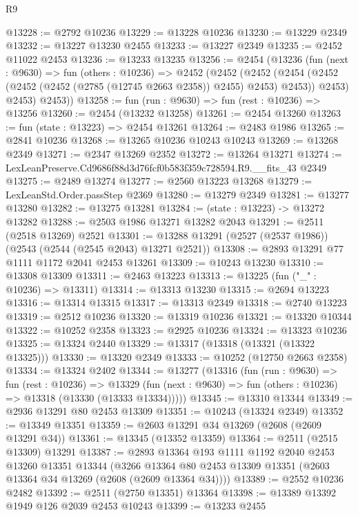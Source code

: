 \begin{lexlean}{R9}
\begin{coremodule}
@13228 := @2792 @10236
@13229 := @13228 @10236
@13230 := @13229 @2349
@13232 := @13227 @13230 @2455
@13233 := @13227 @2349
@13235 := @2452 @11022 @2453
@13236 := @13233 @13235
@13256 := @2454
    (@13236
      (fun (next : @9630) =>
      fun (others : @10236) =>
      @2452
        (@2452
          (@2452
            (@2454 (@2452 (@2452 (@2452 (@2785 (@12745 @2663 @2358)) @2455) @2453) @2453))
            @2453)
          @2453)
        @2453))
@13258 := fun (run : @9630) => fun (rest : @10236) => @13256
@13260 := @2454 (@13232 @13258)
@13261 := @2454 @13260
@13263 := fun (state : @13223) => @2454 @13261
@13264 := @2483 @1986
@13265 := @2841 @10236
@13268 := @13265 @10236 @10243 @10243
@13269 := @13268 @2349
@13271 := @2347 @13269 @2352
@13272 := @13264 @13271
@13274 := LexLeanPreserve.Cd9686f88d3d76fcf0b583f359c728594.R9.__fits_43 @2349
@13275 := @2489 @13274
@13277 := @2560 @13223 @13268
@13279 := LexLeanStd.Order.passStep @2369
@13280 := @13279 @2349
@13281 := @13277 @13280
@13282 := @13275 @13281
@13284 := (state : @13223) -> @13272 @13282
@13288 := @2503 @1986 @13271 @13282 @2043
@13291 := @2511 (@2518 @13269) @2521
@13301 := @13288 @13291 (@2527 (@2537 @1986)) (@2543 (@2544 (@2545 @2043) @13271 @2521))
@13308 := @2893 @13291 @77 @1111 @1172 @2041 @2453 @13261
@13309 := @10243 @13230
@13310 := @13308 @13309
@13311 := @2463 @13223
@13313 := @13225 (fun ("_" : @10236) => @13311)
@13314 := @13313 @13230
@13315 := @2694 @13223
@13316 := @13314 @13315
@13317 := @13313 @2349
@13318 := @2740 @13223
@13319 := @2512 @10236
@13320 := @13319 @10236
@13321 := @13320 @10344
@13322 := @10252 @2358
@13323 := @2925 @10236
@13324 := @13323 @10236
@13325 := @13324 @2440
@13329 := @13317 (@13318 (@13321 (@13322 @13325)))
@13330 := @13320 @2349
@13333 := @10252 (@12750 @2663 @2358)
@13334 := @13324 @2402
@13344 := @13277
    (@13316
      (fun (run : @9630) =>
      fun (rest : @10236) =>
      @13329 (fun (next : @9630) => fun (others : @10236) => @13318 (@13330 (@13333 @13334)))))
@13345 := @13310 @13344
@13349 := @2936 @13291 @80 @2453 @13309
@13351 := @10243 (@13324 @2349)
@13352 := @13349 @13351
@13359 := @2603 @13291 @34 @13269 (@2608 (@2609 @13291 @34))
@13361 := @13345 (@13352 @13359)
@13364 := @2511 (@2515 @13309) @13291
@13387 := @2893
    @13364
    @193
    @1111
    @1192
    @2040
    @2453
    @13260
    @13351
    @13344
    (@3266 @13364 @80 @2453 @13309 @13351 (@2603 @13364 @34 @13269 (@2608 (@2609 @13364 @34))))
@13389 := @2552 @10236 @2482
@13392 := @2511 (@2750 @13351) @13364
@13398 := @13389 @13392 @1949 @126 @2039 @2453 @10243
@13399 := @13233 @2455

\end{coremodule}
\end{lexlean}
